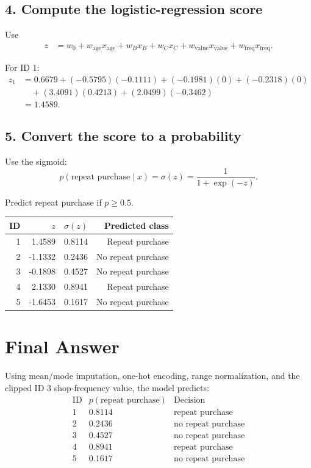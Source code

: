 \documentclass[11pt]{article}
\begin{document}
\subsection*{4. Compute the logistic-regression score}

Use
\[
\begin{aligned}
z
&=
w_0
+w_{\text{age}}x_{\text{age}}
+w_B x_B
+w_C x_C
+w_{\text{value}}x_{\text{value}}
+w_{\text{freq}}x_{\text{freq}}.
\end{aligned}
\]

For ID 1:
\[
\begin{aligned}
z_1
&=
0.6679
 +(-0.5795)(-0.1111)
 +(-0.1981)(0)
 +(-0.2318)(0) \\
&\quad
 +(3.4091)(0.4213)
 +(2.0499)(-0.3462) \\
&=1.4589.
\end{aligned}
\]

\subsection*{5. Convert the score to a probability}

Use the sigmoid:
\[
    p(\text{repeat purchase}\mid x)=\sigma(z)=\frac{1}{1+\exp(-z)}.
\]

Predict repeat purchase if \(p\ge 0.5\).

\begin{center}
\begin{tabular}{rrrr}
\toprule
ID & \(z\) & \(\sigma(z)\) & Predicted class \\
\midrule
1 & 1.4589 & 0.8114 & Repeat purchase \\
2 & -1.1332 & 0.2436 & No repeat purchase \\
3 & -0.1898 & 0.4527 & No repeat purchase \\
4 & 2.1330 & 0.8941 & Repeat purchase \\
5 & -1.6453 & 0.1617 & No repeat purchase \\
\bottomrule
\end{tabular}
\end{center}

\section*{Final Answer}

Using mean/mode imputation, one-hot encoding, range normalization, and the
clipped ID 3 shop-frequency value, the model predicts:
\[
\boxed{
\begin{array}{c|c|c}
\text{ID} & p(\text{repeat purchase}) & \text{Decision} \\
\hline
1 & 0.8114 & \text{repeat purchase} \\
2 & 0.2436 & \text{no repeat purchase} \\
3 & 0.4527 & \text{no repeat purchase} \\
4 & 0.8941 & \text{repeat purchase} \\
5 & 0.1617 & \text{no repeat purchase}
\end{array}}
\]
\end{document}
